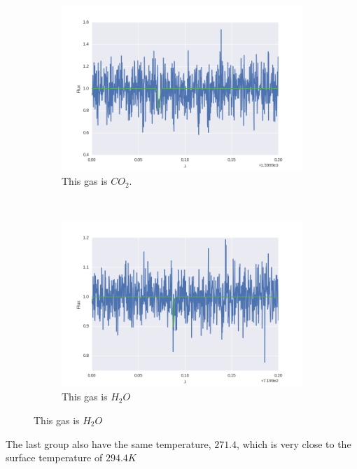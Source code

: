 \documentclass[a4paper, 10pt]{article}
\begin{document}
\begin{figure}[H]
\centering
\begin{subfigure}[t]{0.5\textwidth}
\centering
\includegraphics[width=\textwidth]{part6wrongTemp1600.png}
\caption{This gas is $CO_2$.}
\end{subfigure}%
~
\begin{subfigure}[t]{0.5\textwidth}
\centering
\includegraphics[width=\textwidth]{part6wrongTemp720.png}
\caption{This gas is $H_2O$}
\end{subfigure}%
\end{figure}

The last group also have the same temperature, $271.4$, which is very close to the surface temperature of $294.4 K$
\end{document}
